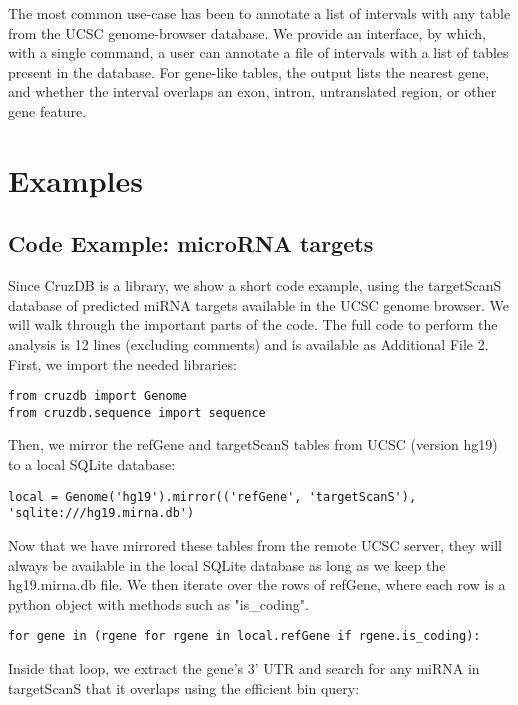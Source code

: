 \documentclass[10pt]{bmc_article}
\newenvironment{bmcformat}{\baselineskip20pt\sloppy\setboolean{publ}{false}}{\baselineskip20pt\sloppy}
\begin{document}
\begin{bmcformat}
The most common use-case has been to annotate a list of intervals with any table from the UCSC genome-browser database. We provide an interface, by which, with a single command, a user can annotate a file of intervals with a list of tables present in the database. For gene-like tables, the output lists the nearest gene, and whether the interval overlaps an exon, intron, untranslated region, or other gene feature.

\section*{Examples}


\subsection*{Code Example: microRNA targets}

Since CruzDB is a library, we show a short code example, using the targetScanS database of predicted miRNA targets \cite{Grimson} available in the UCSC genome browser. We will walk through the important parts of the code. The full code to perform the analysis is 12 lines (excluding comments) and is available as Additional File 2. First, we import the needed libraries:

\begin{verbatim}
from cruzdb import Genome
from cruzdb.sequence import sequence
\end{verbatim}

Then, we mirror the refGene and targetScanS tables from UCSC (version hg19) to a local SQLite database:

\begin{verbatim}
local = Genome('hg19').mirror(('refGene', 'targetScanS'), 'sqlite:///hg19.mirna.db')
\end{verbatim}

Now that we have mirrored these tables from the remote UCSC server, they will always be available in the local SQLite database as long as we keep the hg19.mirna.db file. We then iterate over the rows of refGene, where each row is a python object with methods such as "is\_coding".

\begin{verbatim}
for gene in (rgene for rgene in local.refGene if rgene.is_coding):
\end{verbatim}

Inside that loop, we extract the gene’s 3’ UTR and search for any miRNA in targetScanS that it overlaps using the efficient bin query:


\end{bmcformat}
\end{document}
